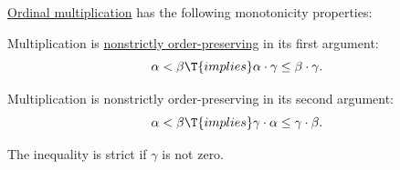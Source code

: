 \begin{proposition}\label{thm:ordinal_multiplication_is_monotone}
  \hyperref[def:ordinal_multiplication]{Ordinal multiplication} has the following monotonicity properties:
  \begin{thmenum}
     Multiplication is \hyperref[def:order_function/preserving]{nonstrictly order-preserving} in its first argument:
    \begin{equation*}
      \alpha < \beta \T{implies} \alpha \cdot \gamma \leq \beta \cdot \gamma.
    \end{equation*}

     Multiplication is nonstrictly order-preserving in its second argument:
    \begin{equation*}
      \alpha < \beta \T{implies} \gamma \cdot \alpha \leq \gamma \cdot \beta.
    \end{equation*}

    The inequality is strict if \( \gamma \) is not zero.
  \end{thmenum}
\end{proposition}
